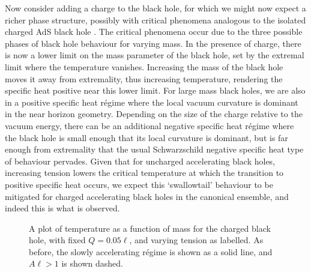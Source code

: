 \documentclass[
twoside,openright,frontopenright]{dmathesis}
\begin{document}
Now consider adding a charge to the black hole, for which we might now expect a
richer phase structure, possibly with critical phenomena analogous to the
isolated charged AdS black hole
\cite{Chamblin:1999tk,Cvetic:1999ne,Chamblin:1999hg}. The critical phenomena
occur due to the three possible phases of black hole behaviour for varying mass.
In the presence of charge, there is now a lower limit on the mass parameter of
the black hole, set by the extremal limit where the temperature vanishes.
Increasing the mass of the black hole moves it away from extremality, thus
increasing temperature, rendering the specific heat positive near this lower
limit. For large mass black holes, we are also in a positive specific heat
r\'egime where the local vacuum curvature is dominant in the near horizon
geometry.  Depending on the size of the charge relative to the vacuum energy,
there can be an additional negative specific heat r\'egime where the black hole
is small enough that its local curvature is dominant, but is far enough from
extremality that the usual Schwarzschild negative specific heat type of
behaviour pervades.  Given that for uncharged accelerating black holes,
increasing tension lowers the critical temperature at which the transition to
positive specific heat occurs, we expect this `swallowtail' behaviour to be
mitigated for charged accelerating black holes in the canonical ensemble, and
indeed this is what is observed.
\begin{figure}
\caption{A plot of temperature as a function of mass for the charged black hole,
  with fixed $Q=0.05\ell$, and varying tension as labelled. As before, the
  slowly accelerating r\'egime is shown as a solid line, and $A\ell>1$ is shown
  dashed.  }
\label{fig:TvMcharge}
\end{figure}
\end{document}
